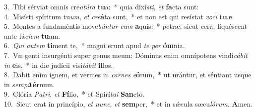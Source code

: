 {3.~}Tibi sérviat omnis cre\textit{a}\textit{tú}\textit{ra} \textbf{tu}a:~* quia dixí\textit{sti}, \textit{et} \textbf{fa}cta sunt:\\
{4.~}Misísti spíritum tu\textit{um}, \textit{et} \textit{cre}\textbf{á}ta sunt,~* et non est qui resístat \textit{vo}\textit{ci} \textbf{tu}æ.\\
{5.~}Montes a fundaméntis move\textit{bún}\textit{tur} \textit{cum} \textbf{a}quis:~* petræ, sicut cera, liquéscent ante fá\textit{ci}\textit{em} \textbf{tu}am.\\
{6.~}\textit{Qui} \textit{au}\textit{tem} \textbf{ti}ment te,~* magni erunt apud \textit{te} \textit{per} \textbf{óm}nia.\\
{7.~}Væ genti insurgénti super genus meum: Dóminus enim omnípotens vindi\textit{cá}\textit{bit} \textit{in} \textbf{e}is,~* in die judícii visi\textit{tá}\textit{bit} \textbf{il}los.\\
{8.~}Dabit enim ignem, et vermes in \textit{car}\textit{nes} \textit{e}\textbf{ó}rum,~* ut urántur, et séntiant usque in \textit{sem}\textit{pi}\textbf{tér}num.\\
{9.~}Glória \textit{Pa}\textit{tri}, \textit{et} \textbf{Fí}lio,~* et Spirí\textit{tu}\textit{i} \textbf{San}cto.\\
{10.~}Sicut erat in princípio, \textit{et} \textit{nunc}, \textit{et} \textbf{sem}per,~* et in sǽcula sæcu\textit{ló}\textit{rum}. \textbf{A}men.\\
